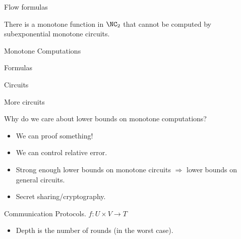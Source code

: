 \begin{frame}{Flow formulas}
    \pause

    \begin{corollary}
        There is a monotone function in $\NC_2$ that cannot be computed by subexponential monotone
        circuits.
    \end{corollary}

\end{frame}



\begin{frame}{Monotone Computations}

    \begin{minipage}{0.33\linewidth}
        \centering
        Formulas
        \vspace{0.2cm}
        
        
    \end{minipage}
    \begin{minipage}{0.33\linewidth}
        \centering
        Circuits
        \vspace{0.2cm}
        
        
    \end{minipage}
    \begin{minipage}{0.32\linewidth}
        \centering
        More circuits
        \vspace{0.2cm}
        
        
    \end{minipage}

    \pause
    Why do we care about lower bounds on monotone computations?
    \begin{itemize}
        \item We can proof something!
            \pause
        \item We can control relative error.
            \pause
        \item Strong enough lower bounds on monotone circuits $\Rightarrow$ lower bounds on general
            circuits.
            \pause
        \item Secret sharing/cryptography.
    \end{itemize}
\end{frame}


\begin{frame}{Communication Protocols. $f\colon U \times V \to T$}
    \begin{center}
    	    
    \end{center}

    \pause
    \pause
    \pause
	\pause

    \begin{itemize}
        \item Depth is the number of rounds (in the worst case).
    \end{itemize}
\end{frame}

